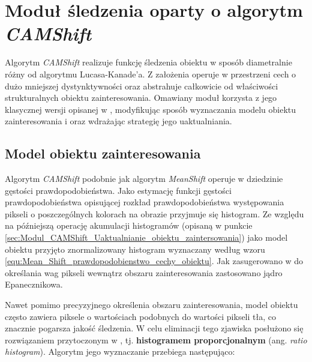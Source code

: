 \chapter{Moduł śledzenia oparty o algorytm \textit{CAMShift}}
\label{cha:Modul_CAMShift}

Algorytm \textit{CAMShift} realizuje funkcję śledzenia obiektu w sposób diametralnie różny od algorytmu Lucasa-Kanade'a. Z założenia operuje w przestrzeni cech o dużo mniejszej dystynktywności oraz abstrahuje całkowicie od właściwości strukturalnych obiektu zainteresowania. Omawiany moduł korzysta z jego klasycznej wersji opisanej w \cite{Bradski1998}, modyfikując sposób wyznaczania modelu obiektu zainteresowania i oraz wdrażając strategię jego uaktualniania.

\section{Model obiektu zainteresowania}
\label{sec:Modul_CAMShift_model_obiektu}

Algorytm \textit{CAMShift} podobnie jak algorytm \textit{MeanShift} operuje w dziedzinie gęstości prawdopodobieństwa. Jako estymację funkcji gęstości prawdopodobieństwa opisującej rozkład prawdopodobieństwa występowania pikseli o poszczególnych kolorach na obrazie przyjmuje się histogram. Ze względu na późniejszą operację akumulacji histogramów (opisaną w punkcie \ref{sec:Modul_CAMShift_Uaktualnianie_obiektu_zaintersowania}) jako model obiektu przyjęto znormalizowany histogram wyznaczany według wzoru \ref{equ:Mean_Shift_prawdopodobienstwo_cechy_obiektu}. Jak zasugerowano w \cite{Comaniciu2003} do określania wag pikseli wewnątrz obszaru zainteresowania zastosowano jądro Epanecznikowa.

Nawet pomimo precyzyjnego określenia obszaru zainteresowania, model obiektu często zawiera piksele o wartościach podobnych do wartości pikseli tła, co znacznie pogarsza jakość śledzenia. W celu eliminacji tego zjawiska posłużono się rozwiązaniem przytoczonym w \cite{Allen2006}, tj. \textbf{histogramem proporcjonalnym} (ang. \textit{ratio histogram}). Algorytm jego wyznaczanie przebiega następująco:

